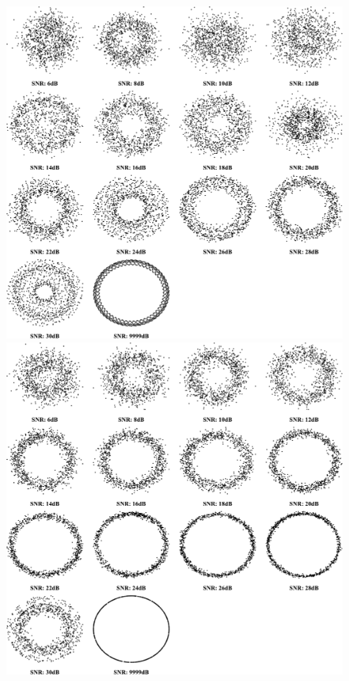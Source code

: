 {
    \begin{figure}[!htbp]
        \centering
        \begin{minipage}{0.48\textwidth}
            \centering
            \includegraphics[scale=0.15]{img/constellations/cropped_constellationAM-SSB-SC.pdf}
        \end{minipage}
        \hfill
        \begin{minipage}{0.48\textwidth}
            \centering
            \includegraphics[scale=0.15]{img/constellations/cropped_constellationFM.pdf}
        \end{minipage}
    \end{figure}
}


